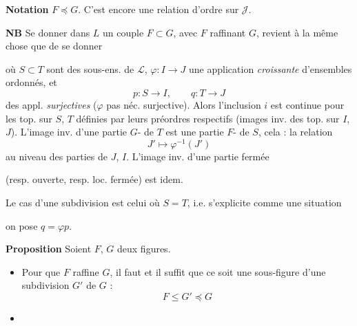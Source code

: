 \documentclass[11pt,a4paper]{article}
\begin{document}
\textbf{Notation} $F \preccurlyeq G$. C'est encore une relation d'ordre sur $\mathcal{J}$.

\textbf{NB} Se donner dans $L$ un couple $F \subset G$, avec $F$ raffinant $G$, revient à la même chose que de se donner


où $S \subset T$ sont des sous-ens. de $\mathcal{L}$, $\varphi : I \to J$ une application \emph{croissante} d'ensembles ordonnés, et
\[
  p : S \to I, \qquad q : T \to J
\]
des appl. \emph{surjectives} ($\varphi$ pas néc. surjective). Alors l'inclusion $i$ est continue pour les top.  sur $S$, $T$ définies par leurs préordres respectifs (images inv. des top. sur $I$, $J$). L'image inv. d'une partie $G$-\ill{} de $T$ est une partie $F$-\ill{} de $S$, cela \ill{} \ill{} \ill{} : la relation
\[
  J' \mapsto \varphi^{-1}(J')
\]
au niveau des parties de $J$, $I$. L'image inv. d'une partie fermée

(resp. ouverte, resp. loc. fermée) est idem.

Le cas d'une subdivision est celui où $S = T$, i.e. s'explicite comme une situation


 on pose $q = \varphi p$.


\textbf{Proposition} Soient $F$, $G$ deux figures.
\begin{itemize}
  \item[a)] Pour que $F$ raffine $G$, il faut et il suffit que ce soit une sous-figure d'une subdivision $G'$ de $G$ :
  \[
    F \leq G' \preccurlyeq G
  \]
  \item[b)] 
\end{itemize}
\end{document}
